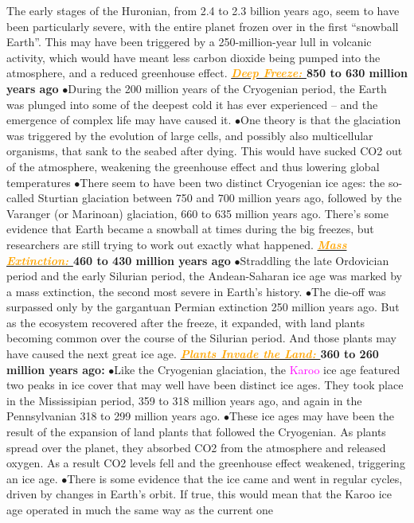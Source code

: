 \documentclass{article}
\newcommand{\ddd}{$\bullet$}
\newcommand{\pink}[1]{\textcolor{magenta}{#1}}
\newcommand{\orange}[1]{\textcolor{orange}{#1}}
\newcommand{\mysub}[1]{\underline{\textbf{{\textit{\orange{#1}}}}}}
\newcommand{\vocab}[1]{{\pink{#1}}}
\begin{document}
\begin{multicols*}{4}
     			The early stages of the Huronian, from 2.4 to 2.3 billion years ago, seem to have been particularly severe, with the entire planet frozen over in the first “snowball Earth”. This may have been triggered by a 250-million-year lull in volcanic activity, which would have meant less carbon dioxide being pumped into the atmosphere, and a reduced greenhouse effect.
     		\mysub{Deep Freeze: }
     			\textbf{850 to 630 million years ago}
     			\ddd During the 200 million years of the Cryogenian period, the Earth was plunged into some of the deepest cold it has ever experienced – and the emergence of complex life may have caused it.
     			\ddd One theory is that the glaciation was triggered by the evolution of large cells, and possibly also multicellular organisms, that sank to the seabed after dying. This would have sucked CO2 out of the atmosphere, weakening the greenhouse effect and thus lowering global temperatures
     			\ddd There seem to have been two distinct Cryogenian ice ages: the so-called Sturtian glaciation between 750 and 700 million years ago, followed by the Varanger (or Marinoan) glaciation, 660 to 635 million years ago. There’s some evidence that Earth became a snowball at times during the big freezes, but researchers are still trying to work out exactly what happened.
  			\mysub{Mass Extinction: }
  				\textbf{460 to 430 million years ago}
  				\ddd Straddling the late Ordovician period and the early Silurian period, the Andean-Saharan ice age was marked by a mass extinction, the second most severe in Earth’s history.
  				\ddd The die-off was surpassed only by the gargantuan Permian extinction 250 million years ago. But as the ecosystem recovered after the freeze, it expanded, with land plants becoming common over the course of the Silurian period. And those plants may have caused the next great ice age.
			\mysub{Plants Invade the Land: }
				\textbf{360 to 260 million years ago: }
				\ddd Like the Cryogenian glaciation, the \vocab{Karoo} ice age featured two peaks in ice cover that may well have been distinct ice ages. They took place in the Mississipian period, 359 to 318 million years ago, and again in the Pennsylvanian 318 to 299 million years ago.
				\ddd These ice ages may have been the result of the expansion of land plants that followed the Cryogenian. As plants spread over the planet, they absorbed CO2 from the atmosphere and released oxygen. As a result CO2 levels fell and the greenhouse effect weakened, triggering an ice age.
				\ddd There is some evidence that the ice came and went in regular cycles, driven by changes in Earth’s orbit. If true, this would mean that the Karoo ice age operated in much the same way as the current one

\end{multicols*}
\end{document}
